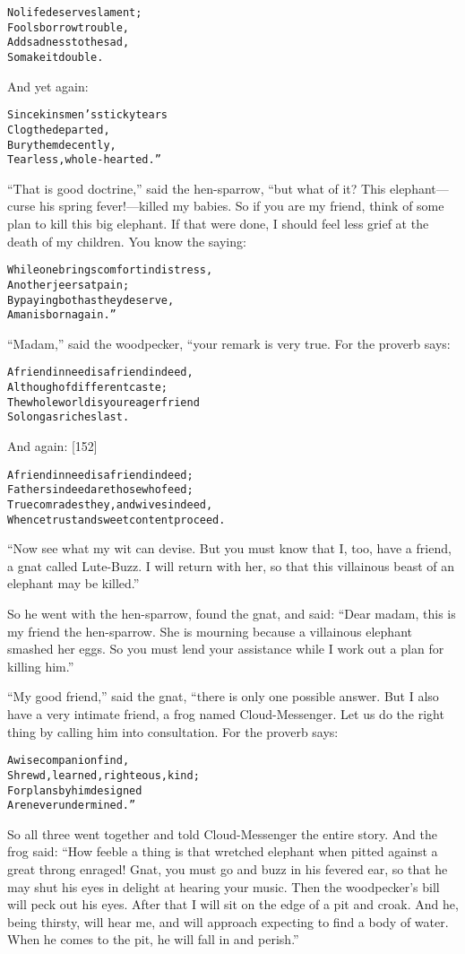 \documentclass{article}
\renewenvironment{verbatim}{\begin{alltt}\normalfont\begin{centering}}{\end{centering}\end{alltt}}
\begin{document}
\begin{verbatim}
No life deserves lament;
    Fools borrow trouble,
Add sadness to the sad,
    So make it double.
\end{verbatim}
And yet again:

\begin{verbatim}
Since kinsmen's sticky tears
    Clog the departed,
Bury them decently,
    Tearless, whole-hearted.”
\end{verbatim}
``That is good doctrine,'' said the hen-sparrow, “but what of it?
This elephant---curse his spring fever!---killed my babies. So if
you are my friend, think of some plan to kill this big elephant. If
that were done, I should feel less grief at the death of my
children. You know the saying:

\begin{verbatim}
While one brings comfort in distress,
    Another jeers at pain;
By paying both as they deserve,
    A man is born again.”
\end{verbatim}
``Madam,'' said the woodpecker, “your remark is very true. For the
proverb says:

\begin{verbatim}
A friend in need is a friend indeed,
    Although of different caste;
The whole world is your eager friend
    So long as riches last.
\end{verbatim}
And again: [152]

\begin{verbatim}
A friend in need is a friend indeed;
Fathers indeed are those who feed;
True comrades they, and wives indeed,
Whence trust and sweet content proceed.
\end{verbatim}
``Now see what my wit can devise. But you must know that I, too, have a friend, a gnat called Lute-Buzz. I will return with her, so that this villainous beast of an elephant may be killed.''

So he went with the hen-sparrow, found the gnat, and said:
``Dear madam, this is my friend the hen-sparrow. She is mourning because a villainous elephant smashed her eggs. So you must lend your assistance while I work out a plan for killing him.''

``My good friend,'' said the gnat, “there is only one possible
answer. But I also have a very intimate friend, a frog named
Cloud-Messenger. Let us do the right thing by calling him into
consultation. For the proverb says:

\begin{verbatim}
A wise companion find,
Shrewd, learned, righteous, kind;
For plans by him designed
Are never undermined.”
\end{verbatim}
So all three went together and told Cloud-Messenger the entire
story. And the frog said:
``How feeble a thing is that wretched elephant when pitted against a great throng enraged! Gnat, you must go and buzz in his fevered ear, so that he may shut his eyes in delight at hearing your music. Then the woodpecker's bill will peck out his eyes. After that I will sit on the edge of a pit and croak. And he, being thirsty, will hear me, and will approach expecting to find a body of water. When he comes to the pit, he will fall in and perish.''
\end{document}
